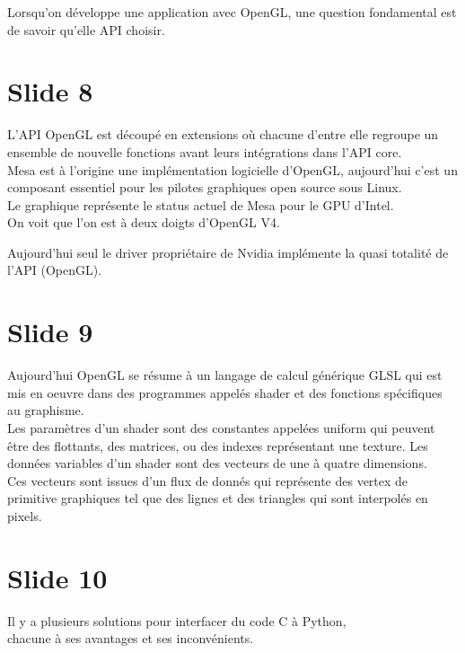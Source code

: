 \documentclass[12pt]{article}
\begin{document}
\noindent%
Lorsqu'on développe une application avec OpenGL, une question fondamental est de savoir qu'elle API choisir.

\section{Slide 8}

\noindent%
L'API OpenGL est découpé en extensions où chacune d'entre elle regroupe un ensemble de nouvelle fonctions avant
leurs intégrations dans l'API core. \\

\noindent%
Mesa est à l'origine une implémentation logicielle d'OpenGL, aujourd'hui c'est un composant
essentiel pour les pilotes graphiques open source sous Linux. \\

\noindent%
Le graphique représente le status actuel de Mesa pour le GPU d'Intel. \\
On voit que l'on est à deux doigts d'OpenGL V4.

\noindent%
Aujourd'hui seul le driver propriétaire de Nvidia implémente la quasi totalité de l'API (OpenGL).

\section{Slide 9}

\noindent%
Aujourd'hui OpenGL se résume à un langage de calcul générique GLSL qui est mis en oeuvre dans des programmes
appelés shader et des fonctions spécifiques au graphisme. \\

\noindent%
Les paramètres d'un shader sont des constantes appelées uniform qui peuvent être des flottants, des
matrices, ou des indexes représentant une texture. Les données variables d'un shader sont des
vecteurs de une à quatre dimensions. \\

\noindent%
Ces vecteurs sont issues d'un flux de donnés qui représente des vertex de primitive graphiques tel
que des lignes et des triangles qui sont interpolés en pixels.  

\section{Slide 10}

\noindent%
Il y a plusieurs solutions pour interfacer du code C à Python, \\
chacune à ses avantages et ses inconvénients. \\
\end{document}
